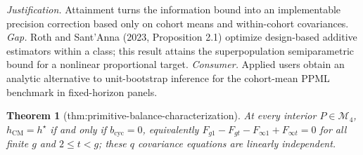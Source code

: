 \documentclass{article}
\newtheorem{theorem}{Theorem}
\begin{document}
\par\smallskip\noindent \textit{Justification.} Attainment turns the information bound into an implementable precision correction based only on cohort means and within-cohort covariances. \textit{Gap.} Roth and Sant'Anna (2023, Proposition 2.1) optimize design-based additive estimators within a class; this result attains the superpopulation semiparametric bound for a nonlinear proportional target. \textit{Consumer.} Applied users obtain an analytic alternative to unit-bootstrap inference for the cohort-mean PPML benchmark in fixed-horizon panels.

\begin{theorem}[thm:primitive-balance-characterization]\label{thm:primitive-balance-characterization}
At every interior \(P\in\mathcal M_4\), \(h_{\mathrm{CM}}=h^{\star}\) if and only if \(b_{\mathrm{cyc}}=0\), equivalently \(F_{g1}-F_{gt}-F_{\infty1}+F_{\infty t}=0\) for all finite \(g\) and \(2\le t<g\); these \(q\) covariance equations are linearly independent.
\end{theorem}
\end{document}
